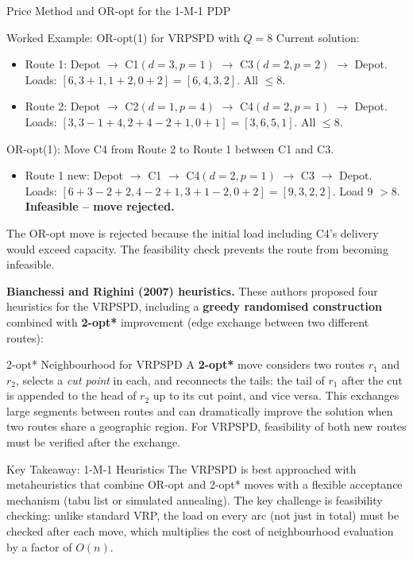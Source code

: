 \documentclass[aspectratio=169,10pt]{beamer}
\begin{document}
\begin{frame}[allowframebreaks]{Price Method and OR-opt for the 1-M-1 PDP}
  \begin{exampleblock}{Worked Example: OR-opt(1) for VRPSPD with $Q=8$}
    Current solution:
    \begin{itemize}
      \item Route 1: Depot $\to$ C1$(d=3,p=1)$ $\to$ C3$(d=2,p=2)$ $\to$ Depot.
            Loads: $[6, 3+1, 1+2, 0+2] = [6, 4, 3, 2]$. All $\leq 8$.  \checkmark
      \item Route 2: Depot $\to$ C2$(d=1,p=4)$ $\to$ C4$(d=2,p=1)$ $\to$ Depot.
            Loads: $[3, 3-1+4, 2+4-2+1, 0+1] = [3, 6, 5, 1]$. All $\leq 8$.  \checkmark
    \end{itemize}
    OR-opt(1): Move C4 from Route 2 to Route 1 between C1 and C3.
    \begin{itemize}
      \item Route 1 new: Depot $\to$ C1 $\to$ C4$(d=2,p=1)$ $\to$ C3 $\to$ Depot.
            Loads: $[6+3-2+2, 4-2+1, 3+1-2, 0+2] = [9, 3, 2, 2]$. Load 9 $> 8$.
            \textbf{Infeasible -- move rejected.}
    \end{itemize}
    The OR-opt move is rejected because the initial load including C4's delivery would
    exceed capacity. The feasibility check prevents the route from becoming infeasible.
  \end{exampleblock}

  \framebreak

  \textbf{Bianchessi and Righini (2007) heuristics.} These authors proposed four heuristics
  for the VRPSPD, including a \textbf{greedy randomised construction} combined with
  \textbf{2-opt*} improvement (edge exchange between two different routes):

  \begin{block}{2-opt* Neighbourhood for VRPSPD}
    A \textbf{2-opt*} move considers two routes $r_1$ and $r_2$, selects a \emph{cut point}
    in each, and reconnects the tails: the tail of $r_1$ after the cut is appended to the
    head of $r_2$ up to its cut point, and vice versa. This exchanges large segments between
    routes and can dramatically improve the solution when two routes share a geographic region.
    For VRPSPD, feasibility of both new routes must be verified after the exchange.
  \end{block}

  \begin{alertblock}{Key Takeaway: 1-M-1 Heuristics}
    The VRPSPD is best approached with metaheuristics that combine OR-opt and 2-opt*
    moves with a flexible acceptance mechanism (tabu list or simulated annealing).
    The key challenge is feasibility checking: unlike standard VRP, the load on every
    arc (not just in total) must be checked after each move, which multiplies the
    cost of neighbourhood evaluation by a factor of $O(n)$.
  \end{alertblock}

\end{frame}
\end{document}
